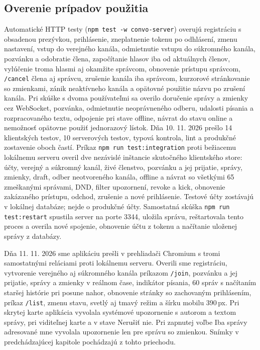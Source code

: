 \documentclass[11pt,a4paper]{article}
\begin{document}
\subsection{Overenie prípadov použitia}
Automatické HTTP testy (\texttt{npm test -w convo-server}) overujú
registráciu s obsadenou prezývkou, prihlásenie, zneplatnenie tokenu po
odhlásení, zmenu nastavení, vstup do verejného kanála, odmietnutie vstupu
do súkromného kanála, pozvánku a odobratie člena, započítanie hlasov iba od
aktuálnych členov, vylúčenie troma hlasmi aj okamžite správcom, obnovenie
prístupu správcom, \texttt{/cancel} člena aj správcu, zrušenie kanála iba
správcom, kurzorové stránkovanie so zmienkami, zánik neaktívneho kanála
a opätovné použitie názvu po zrušení kanála. Pri skúške s dvoma
používateľmi sa overilo doručenie správy a zmienky cez WebSocket,
pozvánka, odmietnutie neoprávneného odberu, udalosti písania a
rozpracovaného textu, odpojenie pri stave offline, návrat do stavu online
a nemožnosť opätovne použiť jednorazový lístok.
Dňa 10. 11. 2026 prešlo 14 klientských testov, 10 serverových testov,
typová kontrola, lint a produkčné zostavenie oboch častí.
Príkaz \texttt{npm run test:integration} proti bežiacemu lokálnemu serveru
overil dve nezávislé inštancie skutočného klientského store: účty, verejný
a súkromný kanál, živé členstvo, pozvánku a jej prijatie, správy,
zmienky, draft, odber neotvoreného kanála, offline a návrat so všetkými
65 zmeškanými správami, DND, filter upozornení, revoke a kick,
obnovenie zakázaného prístupu, odchod, zrušenie a nové prihlásenie.
Testové účty zostávajú v lokálnej databáze; nejde o produkčné účty.
Samostatná skúška \texttt{npm run test:restart} spustila server na porte
3344, uložila správu, reštartovala tento proces a overila nové spojenie,
obnovenie účtu z tokenu a načítanie uloženej správy z databázy.

Dňa 11. 11. 2026 sme aplikáciu prešli v prehliadači Chromium s tromi
samostatnými reláciami proti lokálnemu serveru. Overili sme registráciu,
vytvorenie verejného aj súkromného kanála príkazom \texttt{/join},
pozvánku a jej prijatie, správy a zmienky v reálnom čase, indikátor
písania, 60 správ s načítaním staršej histórie pri posune nahor,
obnovenie stránky so zachovaným prihlásením, príkaz \texttt{/list},
zmenu stavu, svetlý aj tmavý režim a šírku mobilu 390\,px. Pri skrytej
karte aplikácia vyvolala systémové upozornenie s autorom a textom správy,
pri viditeľnej karte a v stave Nerušiť nie. Pri zapnutej voľbe Iba správy
adresované mne vyvolala upozornenie len pre správu so zmienkou. Snímky
v predchádzajúcej kapitole pochádzajú z tohto priechodu.
\end{document}
